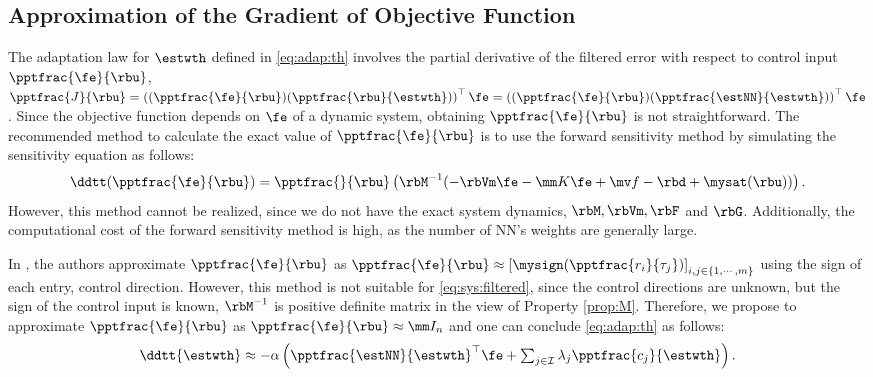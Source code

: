 \documentclass[lettersize,journal]{IEEEtran}
\begin{document}
\subsection{Approximation of the Gradient of Objective Function}

The adaptation law for $\estwth$ defined in \eqref{eq:adap:th} involves the partial derivative of the filtered error with respect to control input $\pptfrac{\fe}{\rbu}$, \ie 
$
    \pptfrac{J}{\rbu}
    =
    \left(
        (\pptfrac{\fe}{\rbu})
        (\pptfrac{\rbu}{\estwth})
    \right)
    ^\top \fe
    =
    \left(
        (\pptfrac{\fe}{\rbu})
        (\pptfrac{\estNN}{\estwth})
    \right)
    ^\top \fe
$. 
Since the objective function depends on $\fe$ of a dynamic system, obtaining $\pptfrac{\fe}{\rbu}$ is not straightforward. 
The recommended method to calculate the exact value of $\pptfrac{\fe}{\rbu}$ is to use the forward sensitivity method \cite{Sengupta:2014aa} by simulating the sensitivity equation as follows: 
\begin{equation}
    \ddtt (
        \pptfrac{\fe}{\rbu}
    )
    =
    \pptfrac{}{
        \rbu
    }
    \left(
        \rbM^{-1}(
            -\rbVm \fe
            -\mm K \fe
            + \mv f
            -\rbd + \mysat(\rbu)
        )
    \right)
    .
\end{equation}
However, this method cannot be realized, since we do not have the exact system dynamics, \ie $\rbM,\rbVm, \rbF$ and $ \rbG$.
Additionally, the computational cost of the forward sensitivity method is high, as the number of NN's weights are generally large.

In \cite{Douratsos:2007aa,Saerens:1991aa}, the authors approximate $\pptfrac{\fe}{\rbu}$ as $
    \pptfrac{\fe}{\rbu}
    \approx
    \left[
        \mysign(\pptfrac{r_i}{\tau_j})
    \right]_{i,j\in\{1,\cdots,m\}}
$ using the sign of each entry, \ie control direction.
However, this method is not suitable for \eqref{eq:sys:filtered}, since the control directions are unknown, but the sign of the control input is known, \ie $\rbM^{-1}$ is positive definite matrix in the view of Property \ref{prop:M}.
Therefore, we propose to approximate $\pptfrac{\fe}{\rbu}$ as $\pptfrac{\fe}{\rbu}\approx \mm I_n$ and one can conclude \eqref{eq:adap:th} as follows:
\begin{equation}
    \ddtt{\estwth}
    \approx
    -\alpha 
    \left(
        \pptfrac{\estNN}
        {\estwth}^\top
        \fe
        +
        \textstyle\sum_{j\in\mathcal{I}}
        \lambda_j 
        \pptfrac{c_j}{\estwth}
    \right)
    .
    \label{eq:adap:th:approx}
\end{equation}
\end{document}
